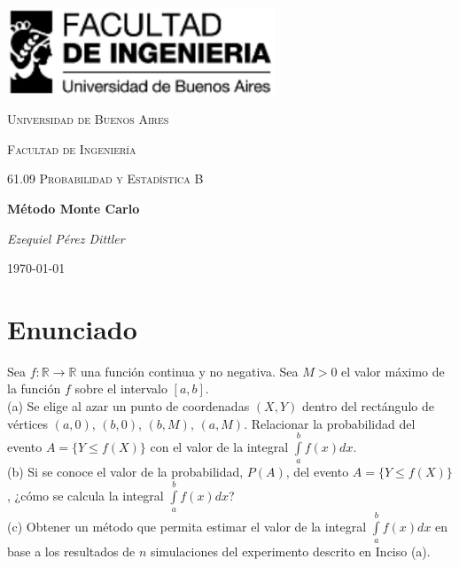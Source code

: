 \documentclass[a4paper]{article}
\begin{document}
\begin{titlepage}
  \centering
  \includegraphics[width=0.6\textwidth]{logo_fiuba.pdf}\par\vspace{1cm}
  {\scshape\LARGE Universidad de Buenos Aires \par}
  {\scshape\LARGE Facultad de Ingeniería \par}
  \vspace{1cm}
  {\scshape\Large 61.09 Probabilidad y Estadística B\par}
  \vspace{1.5cm}
  {\huge\bfseries Método Monte Carlo\par}
  \vspace{2cm}
  {\Large\itshape Ezequiel Pérez Dittler \par}

  \vfill

  {\large \today\par}
\end{titlepage}

\newpage

\section{Enunciado}
Sea $f: \mathbb{R} \to \mathbb{R}$ una función continua y no negativa.
Sea $M > 0$ el valor máximo de la función $f$ sobre el intervalo $[a, b]$. \\

(a) Se elige al azar un punto de coordenadas $(X, Y)$ dentro del rectángulo de
vértices $(a, 0)$, $(b, 0)$, $(b, M)$, $(a, M)$. Relacionar la probabilidad
del evento $A = \{ Y \leqslant f(X) \}$ con el valor de la integral
$\int\limits_a^b f(x) dx$. \\

(b) Si se conoce el valor de la probabilidad, $P(A)$, del evento
$A = \{ Y \leqslant f(X) \}$, ¿cómo se calcula la integral
$\int\limits_a^b f(x) dx$? \\

(c) Obtener un método que permita estimar el valor de la integral
$\int\limits_a^b f(x) dx$ en base a los resultados de $n$ simulaciones del
experimento descrito en Inciso (a). \\
\end{document}
